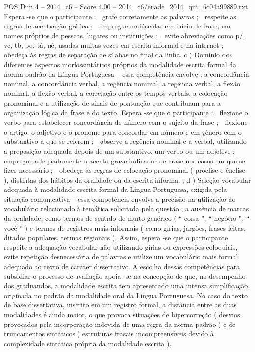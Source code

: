 \begin{textsample}{POS Dim 4 – 2014\_c6 – Score 4.00 – 2014\_c6/enade\_2014\_qui\_6c04a99889.txt}
Espera -se que o participante :  grafe corretamente as palavras ;  respeite as regras de acentuação gráfica ;  empregue maiúsculas em início de frase, em nomes próprios de pessoas, lugares ou instituições ;  evite abreviações como p/, vc, tb, pq, tá, né, usadas muitas vezes em escrita informal e na internet ;  obedeça às regras de separação de sílabas no final da linha. c ) Domínio dos diferentes aspectos morfossintáticos próprios da modalidade escrita formal da norma-padrão da Língua Portuguesa – essa competência envolve : a concordância nominal, a concordância verbal, a regência nominal, a regência verbal, a flexão nominal, a flexão verbal, a correlação entre os tempos verbais, a colocação pronominal e a utilização de sinais de pontuação que contribuam para a organização lógica da frase e do texto.
Espera -se que o participante :  flexione o verbo para estabelecer concordância de número com o sujeito da frase ;  flexione o artigo, o adjetivo e o pronome para concordar em número e em gênero com o substantivo a que se referem ;  observe a regência nominal e a verbal, utilizando a preposição adequada depois de um substantivo, um verbo ou um adjetivo ;  empregue adequadamente o acento grave indicador de crase nos casos em que se fizer necessário ;  obedeça às regras de colocação pronominal ( próclise e ênclise ), distintas dos hábitos da oralidade ou da escrita informal ; d ) Seleção vocabular adequada à modalidade escrita formal da Língua Portuguesa, exigida pela situação comunicativa – essa competência envolve a precisão na utilização do vocabulário relacionado à temática solicitada pela questão ; a ausência de marcas da oralidade, como termos de sentido de muito genérico ( “ coisa ”, “ negócio ”, “ você ” ) e termos de registros mais informais ( como gírias, jargões, frases feitas, ditados populares, termos regionais ).
Assim, espera -se que o participante respeite a adequação vocabular não utilizando gírias ou expressões coloquiais, evite repetição desnecessária de palavras e utilize um vocabulário mais formal, adequado ao texto de caráter dissertativo.
A escolha dessas competências para subsidiar o processo de avaliação apoia -se na concepção de que, no desempenho dos graduandos, a modalidade escrita tem apresentado uma intensa simplificação, originada no padrão da modalidade oral da Língua Portuguesa.
No caso do texto de base dissertativa, inscrito em um registro formal, a distância entre as duas modalidades é ainda maior, o que provoca situações de hipercorreção ( desvios provocados pela incorporação indevida de uma regra da norma-padrão ) e de truncamentos sintáticos ( estruturas frasais incompreensíveis devido à complexidade sintática própria da modalidade escrita ).

\end{textsample}
